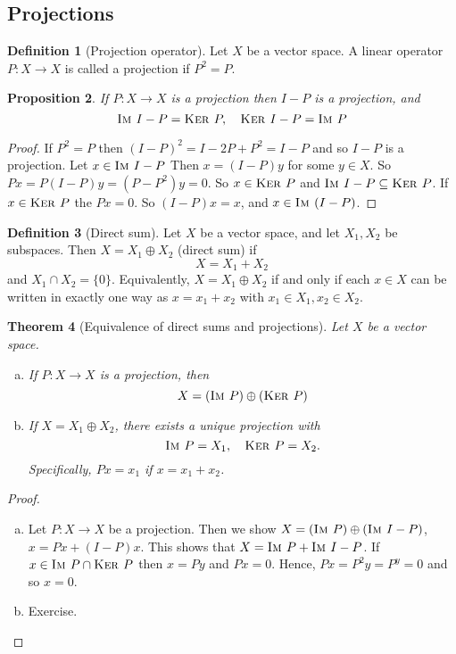 \documentclass[10pt, reqno, oneside]{amsart}
\theoremstyle{plain}%
\newtheorem{thm}{Theorem}[section]
\newtheorem{prop}[thm]{Proposition}
\theoremstyle{definition}
\newtheorem{defn}[thm]{Definition}
\theoremstyle{remark}
\newcommand{\im}{\textsc{Im\ }}
\renewcommand{\ker}{\textsc{Ker\ }}
\begin{document}
\subsection{Projections} %
\label{sub:projections}

\begin{defn}[Projection operator]
	Let $X$ be a vector space.  A linear operator $P : X \rightarrow X$ is called a projection if $P^2 = P$.
\end{defn}
\begin{prop}
	If $P : X \rightarrow X$ is a projection then $I - P$ is a projection, and \[
		\im I - P= \ker P, \quad \ker I - P = \im P
	\]
\end{prop}

\begin{proof}
	If $P^2 = P$ then $(I - P)^2 = I - 2P + P^2 = I - P$ and so $I -  P$ is a projection.  Let $x \in \im I-P$  Then $x = (I - P)y$ for some $y \in X$.  So $P x = P(I - P)y = (P - P^2) y = 0$.  So $x \in \ker P$ and $\im I - P \subseteq \ker P$.  If $x \in \ker P$ the $Px = 0$.  So $(I - P) x = x$, and $x \in \im(I - P)$. 
\end{proof}

\begin{defn}[Direct sum]
	Let $X$ be a vector space, and let $X_1, X_2$ be subspaces.  Then $X = X_1 \oplus X_2$ (direct sum) if \[
		X = X_1 + X_2
	\] and $X_1 \cap X_2 = \{ 0 \}$.  Equivalently, $X = X_1 \oplus X_2$ if and only if each $x \in X$ can be written in exactly one way as $x = x_1 + x_2$ with $x_1 \in X_1, x_2 \in X_2$.  
\end{defn}
\begin{thm}[Equivalence of direct sums and projections]
	Let $X$ be a vector space.  \begin{enumerate}[(a)]
		\item If $P : X \rightarrow X$ is a projection, then \[
			X = (\im P) \oplus (\ker P) 
		\] 
		\item If $X = X_1 \oplus X_2$, there exists a unique projection with \[
			\im P = X_1, \quad \ker P = X_2.
		\] Specifically, $Px = x_1$ if $x = x_1 + x_2$. 
	\end{enumerate}
\end{thm}

\begin{proof}
	\begin{enumerate}[(a)]
		\item Let $P : X \rightarrow X$ be a projection.  Then we show $X = (\im P) \oplus (\im I - P)$, $x = Px + (I - P) x$.  This shows that $X = \im P + \im I - P$.  If $x \in \im P \cap \ker P$ then $x = Py$ and $Px = 0$.  Hence, $Px = P^2 y = P^y = 0$ and so $ x = 0$.
		\item Exercise.  
	\end{enumerate}
\end{proof}
\end{document}
